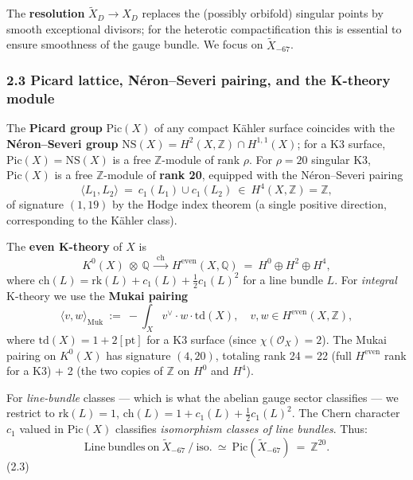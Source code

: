 \documentclass[
  11pt,
  a4paper,
]{article}
\begin{document}
The \textbf{resolution} \(\tilde X_D \to X_D\) replaces the (possibly orbifold) singular points by smooth exceptional divisors; for the heterotic compactification this is essential to ensure smoothness of the gauge bundle. We focus on \(\tilde X_{-67}\).

\hypertarget{picard-lattice-nuxe9ronseveri-pairing-and-the-k-theory-module}{%
\subsubsection{2.3 Picard lattice, Néron--Severi pairing, and the K-theory module}\label{picard-lattice-nuxe9ronseveri-pairing-and-the-k-theory-module}}

The \textbf{Picard group} \(\mathrm{Pic}(X)\) of any compact Kähler surface coincides with the \textbf{Néron--Severi group} \(\mathrm{NS}(X) = H^2(X, \mathbb Z) \cap H^{1,1}(X)\); for a K3 surface, \(\mathrm{Pic}(X) = \mathrm{NS}(X)\) is a free \(\mathbb Z\)-module of rank \(\rho\). For \(\rho = 20\) singular K3, \(\mathrm{Pic}(X)\) is a free \(\mathbb Z\)-module of \textbf{rank 20}, equipped with the Néron--Severi pairing
\[
\langle L_1, L_2 \rangle\ =\ c_1(L_1) \cup c_1(L_2)\ \in\ H^4(X, \mathbb Z) = \mathbb Z,
\]
of signature \((1, 19)\) by the Hodge index theorem (a single positive direction, corresponding to the Kähler class).

The \textbf{even K-theory} of \(X\) is
\[
K^0(X)\ \otimes\ \mathbb Q\ \xrightarrow{\ \mathrm{ch}\ }\ H^{\mathrm{even}}(X, \mathbb Q)\ =\ H^0 \oplus H^2 \oplus H^4,
\]
where \(\mathrm{ch}(L) = \mathrm{rk}(L) + c_1(L) + \tfrac{1}{2}c_1(L)^2\) for a line bundle \(L\). For \emph{integral} K-theory we use the \textbf{Mukai pairing}
\[
\langle v, w \rangle_{\mathrm{Muk}}\ :=\ -\int_X v^\vee \cdot w \cdot \mathrm{td}(X),\quad v, w \in H^{\mathrm{even}}(X, \mathbb Z),
\]
where \(\mathrm{td}(X) = 1 + 2[\mathrm{pt}]\) for a K3 surface (since \(\chi(\mathcal O_X) = 2\)). The Mukai pairing on \(K^0(X)\) has signature \((4, 20)\), totaling rank 24 = 22 (full \(H^{\mathrm{even}}\) rank for a K3) + 2 (the two copies of \(\mathbb Z\) on \(H^0\) and \(H^4\)).

For \emph{line-bundle} classes --- which is what the abelian gauge sector classifies --- we restrict to \(\mathrm{rk}(L) = 1\), \(\mathrm{ch}(L) = 1 + c_1(L) + \tfrac{1}{2}c_1(L)^2\). The Chern character \(c_1\) valued in \(\mathrm{Pic}(X)\) classifies \emph{isomorphism classes of line bundles}. Thus:
\[
\boxed{\ \mathrm{Line\ bundles\ on\ } \tilde X_{-67}\ /\ \mathrm{iso.}\ \simeq\ \mathrm{Pic}(\tilde X_{-67})\ =\ \mathbb Z^{20}.\ }
\]
(2.3)
\end{document}
